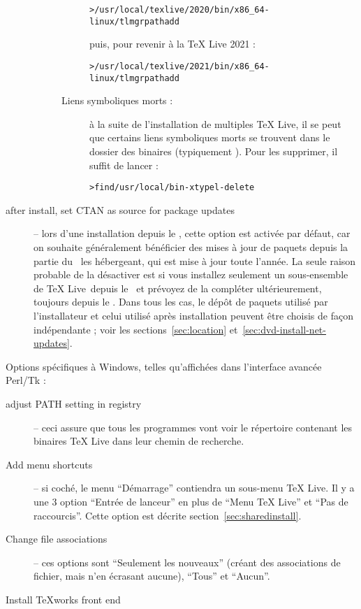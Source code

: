 \documentclass[german, english, french]{article}
\renewcommand{\TL}{\TeX{} Live\xspace}%
\begin{document}
\begin{description}
\begin{description}
\begin{description}
\begin{alltt}
> /usr/local/texlive/2020/bin/x86_64-linux/tlmgr path add
\end{alltt}
      puis, pour revenir à la \TL{} 2021 :
\begin{alltt}
> /usr/local/texlive/2021/bin/x86_64-linux/tlmgr path add
\end{alltt}
    \item[Liens symboliques morts :] à la suite de l'installation de multiples
      \TL{}, il se peut que certains liens symboliques morts se trouvent dans le
      dossier des binaires (typiquement ). Pour les
      supprimer, il suffit de lancer :
\begin{alltt}
> find /usr/local/bin -xtype l -delete
\end{alltt}
    \end{description}
  \end{description}

\item[after install, set CTAN as source for package updates] -- lors d'une
  installation depuis le \DVD, cette option est activée par défaut, car on
  souhaite généralement bénéficier des mises à jour de paquets depuis la partie
  du \CTAN\ les hébergeant, qui est mise à jour toute l'année. La seule raison
  probable de la désactiver est si vous installez seulement un sous-ensemble de
  \TL\ depuis le \DVD\ et prévoyez de la compléter ultérieurement, toujours
  depuis le \DVD. Dans tous les cas, le dépôt de paquets utilisé par
  l'installateur et celui utilisé après installation peuvent être choisis de
  façon indépendante ; voir les sections~\ref{sec:location}
  et~\ref{sec:dvd-install-net-updates}.
\end{description}

Options spécifiques à Windows, telles qu'affichées dans l'interface avancée
Perl/Tk :
\begin{description}
\item[adjust PATH setting in registry] -- ceci assure que tous les programmes
  vont voir le répertoire contenant les binaires \TL{} dans leur chemin de
  recherche.

\item[Add menu shortcuts] -- si coché, le menu \enquote{Démarrage} contiendra un
  sous-menu \TL{}. Il y a une 3\ieme{} option \enquote{Entrée de lanceur} en
  plus de \enquote{Menu \TL{}} et \enquote{Pas de raccourcis}. Cette option est
  décrite section~\ref{sec:sharedinstall}.

\item[Change file associations] -- ces options sont \enquote{Seulement les
    nouveaux} (créant des associations de fichier, mais n'en écrasant aucune),
  \enquote{Tous} et \enquote{Aucun}.

\item[Install \TeX{}works front end]
\end{description}
\end{document}
